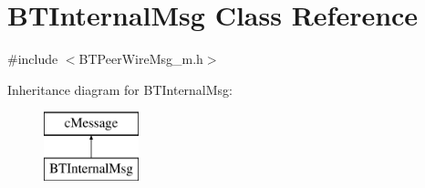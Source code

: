 \hypertarget{classBTInternalMsg}{}\section{B\+T\+Internal\+Msg Class Reference}
\label{classBTInternalMsg}


{\ttfamily \#include $<$B\+T\+Peer\+Wire\+Msg\+\_\+m.\+h$>$}

Inheritance diagram for B\+T\+Internal\+Msg\+:\begin{figure}[H]
\begin{center}
\leavevmode
\includegraphics[height=2.000000cm]{classBTInternalMsg}
\end{center}
\end{figure}
